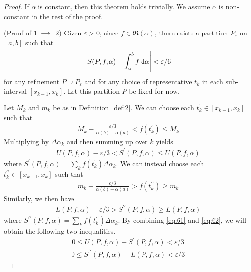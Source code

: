 \documentclass[thmcnt=section, 12pt]{my-elegantbook}
\begin{document}
\begin{proof}
    If $\alpha$ is constant, then this theorem holds trivially. We assume $\alpha$ is non-constant in the rest of the proof.

    (Proof of 1 $\implies$ 2) Given $\varepsilon > 0$, since $f \in \mathfrak{R}(\alpha)$, there exists a partition $P_\varepsilon$ on $[a, b]$ such that
    \begin{align}
        \left\lvert S(P,f,\alpha) - \int_{a}^{b} f \; \mathrm{d}\alpha \right\rvert < \varepsilon / 6
        \label{eq:60}
    \end{align}
    for any refinement $P \supseteq P_\varepsilon$ and for any choice of representative $t_k$ in each sub-interval $[x_{k-1}, x_k]$. Let this partition $P$ be fixed for now.

    Let $M_k$ and $m_k$ be as in Definition~\ref{def:2}. We can choose each $t_k^\prime \in [x_{k-1}, x_k]$ such that
    \begin{align*}
        M_k - \frac{\varepsilon / 3}{\alpha(b) - \alpha(a)}
        < f(t_k^\prime)
        \leq M_k
    \end{align*}
    Multiplying by $\Delta \alpha_k$ and then summing up over $k$ yields
    \begin{align}
        U(P,f,\alpha) - \varepsilon / 3
        < S^\prime(P,f,\alpha)
        \leq U(P,f,\alpha)
        \label{eq:61}
    \end{align}
    where $S^\prime(P,f,\alpha) = \sum_{k} f(t_k^\prime) \Delta\alpha_k$. We can instead choose each $t_k^{\prime\prime} \in [x_{k-1}, x_k]$ such that
    \begin{align*}
        m_k + \frac{\varepsilon / 3}{\alpha(b) - \alpha(a)}
        > f(t_k^{\prime\prime})
        \geq m_k
    \end{align*}
    Similarly, we then have
    \begin{align}
        L(P,f,\alpha) + \varepsilon / 3
        > S^{\prime\prime}(P,f,\alpha)
        \geq L(P,f,\alpha)
        \label{eq:62}
    \end{align}
    where $S^{\prime\prime}(P,f,\alpha) = \sum_{k} f(t_k^{\prime\prime}) \Delta\alpha_k$. By combining \eqref{eq:61} and \eqref{eq:62}, we will obtain the following two inequalities.
    \begin{align}
        0
        \leq U(P,f,\alpha) - S^{\prime}(P,f,\alpha)
        < \varepsilon / 3
        \label{eq:63}
    \end{align}
    \begin{align}
        0
        \leq S^{\prime\prime}(P,f,\alpha) - L(P,f,\alpha)
        < \varepsilon / 3
        \label{eq:64}
    \end{align}


\end{proof}
\end{document}
